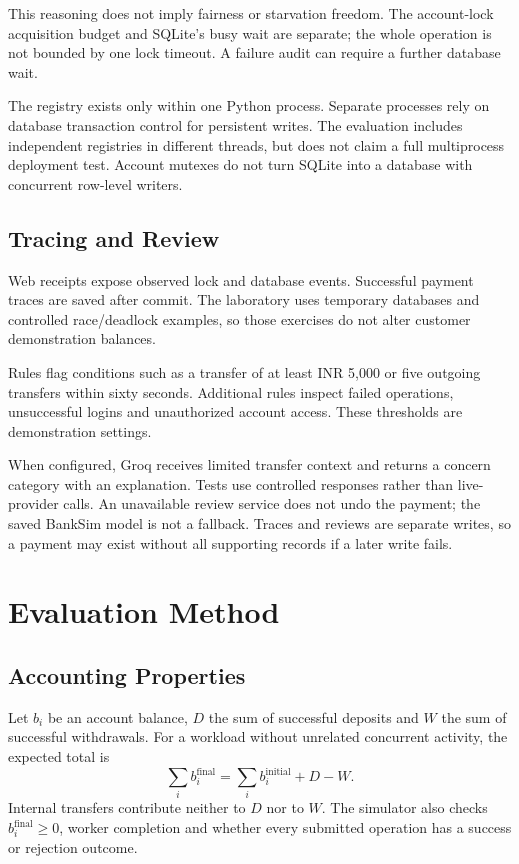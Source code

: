 \documentclass[conference]{IEEEtran}
\begin{document}
This reasoning does not imply fairness or starvation freedom. The account-lock acquisition budget and SQLite's busy wait are separate; the whole operation is not bounded by one lock timeout. A failure audit can require a further database wait.

The registry exists only within one Python process. Separate processes rely on database transaction control for persistent writes. The evaluation includes independent registries in different threads, but does not claim a full multiprocess deployment test. Account mutexes do not turn SQLite into a database with concurrent row-level writers.

\subsection{Tracing and Review}
Web receipts expose observed lock and database events. Successful payment traces are saved after commit. The laboratory uses temporary databases and controlled race/deadlock examples, so those exercises do not alter customer demonstration balances.

Rules flag conditions such as a transfer of at least INR 5,000 or five outgoing transfers within sixty seconds. Additional rules inspect failed operations, unsuccessful logins and unauthorized account access. These thresholds are demonstration settings.

When configured, Groq receives limited transfer context and returns a concern category with an explanation. Tests use controlled responses rather than live-provider calls. An unavailable review service does not undo the payment; the saved BankSim model is not a fallback. Traces and reviews are separate writes, so a payment may exist without all supporting records if a later write fails.

\section{Evaluation Method}
\subsection{Accounting Properties}
Let $b_i$ be an account balance, $D$ the sum of successful deposits and $W$ the sum of successful withdrawals. For a workload without unrelated concurrent activity, the expected total is
\begin{equation}
\sum_i b_i^{\mathrm{final}} =
\sum_i b_i^{\mathrm{initial}} + D - W.
\label{eq:accounting}
\end{equation}
Internal transfers contribute neither to $D$ nor to $W$. The simulator also checks $b_i^{\mathrm{final}}\geq0$, worker completion and whether every submitted operation has a success or rejection outcome.
\end{document}

